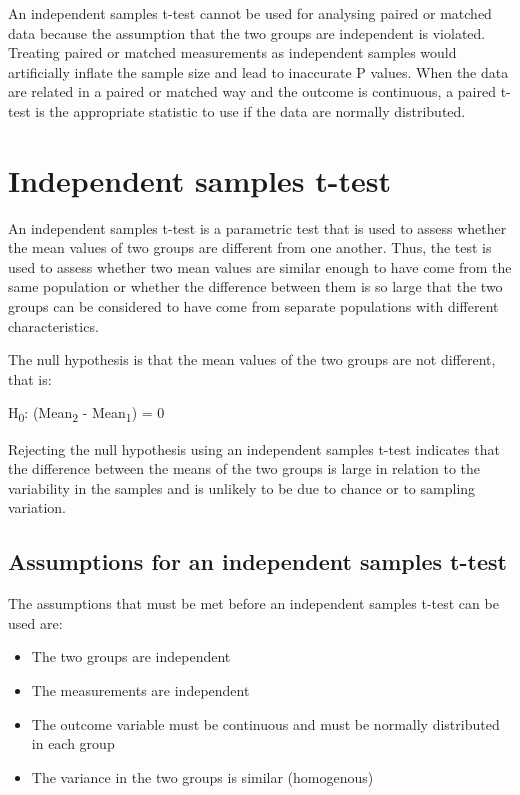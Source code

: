 \documentclass[
]{memoir}
\providecommand{\tightlist}{%
  \setlength{\itemsep}{0pt}\setlength{\parskip}{0pt}}
\begin{document}
An independent samples t-test cannot be used for analysing paired or matched data because the assumption that the two groups are independent is violated. Treating paired or matched measurements as independent samples would artificially inflate the sample size and lead to inaccurate P values. When the data are related in a paired or matched way and the outcome is continuous, a paired t-test is the appropriate statistic to use if the data are normally distributed.

\hypertarget{independent-samples-t-test}{%
\section{Independent samples t-test}\label{independent-samples-t-test}}

An independent samples t-test is a parametric test that is used to assess whether the mean values of two groups are different from one another. Thus, the test is used to assess whether two mean values are similar enough to have come from the same population or whether the difference between them is so large that the two groups can be considered to have come from separate populations with different characteristics.

The null hypothesis is that the mean values of the two groups are not different, that is:

H\textsubscript{0}: (Mean\textsubscript{2} - Mean\textsubscript{1}) = 0

Rejecting the null hypothesis using an independent samples t-test indicates that the difference between the means of the two groups is large in relation to the variability in the samples and is unlikely to be due to chance or to sampling variation.

\hypertarget{assumptions-for-an-independent-samples-t-test}{%
\subsection{Assumptions for an independent samples t-test}\label{assumptions-for-an-independent-samples-t-test}}

The assumptions that must be met before an independent samples t-test can be used are:

\begin{itemize}
\tightlist
\item
  The two groups are independent
\item
  The measurements are independent
\item
  The outcome variable must be continuous and must be normally distributed in each group
\item
  The variance in the two groups is similar (homogenous)
\end{itemize}
\end{document}
